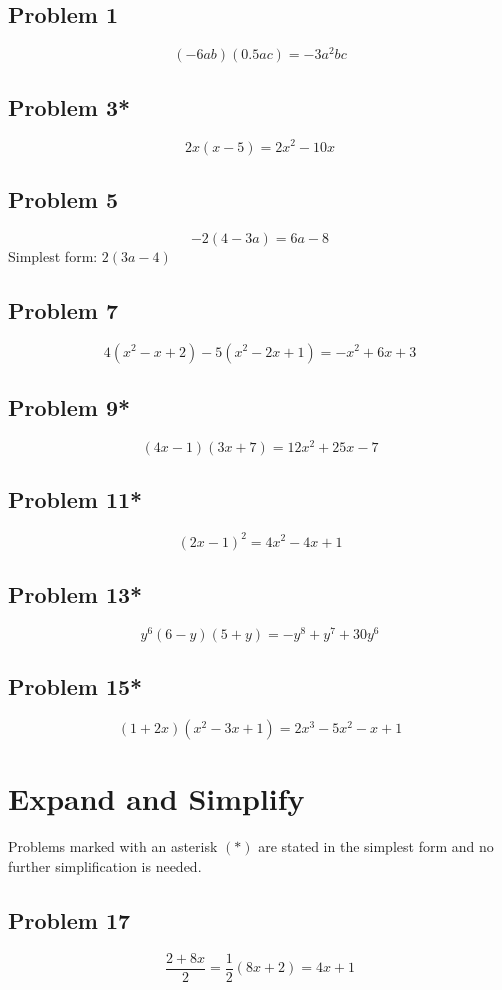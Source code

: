 \documentclass[11pt, oneside]{article}   	%
\begin{document}
\subsection{Problem 1}
$$(-6ab)(0.5ac)=-3a^{2}bc$$

\subsection{Problem 3*}
$$2 x (x - 5)=2 x^2-10 x$$

\subsection{Problem 5}
$$-2 (4 - 3 a) = 6 a -8 $$
Simplest form: $2 (3 a - 4)$

\subsection{Problem 7}
$$4 \left(x^2-x+2\right)-5 \left(x^2-2 x+1\right)=-x^2+6 x+3$$

\subsection{Problem 9*}
$$(4 x - 1) (3 x + 7) = 12 x^2+25 x-7$$

\subsection{Problem 11*}
$$(2 x - 1)^2=4 x^2-4 x+1$$

\subsection{Problem 13*}
$$y^6 (6 - y) (5 + y)=-y^8+y^7+30 y^6$$

\subsection{Problem 15*}
$$(1 + 2 x) (x^2 - 3 x + 1)=2 x^3-5 x^2-x+1$$


\section{Expand and Simplify}
Problems marked with an asterisk $(*)$ are stated in the simplest form and no further simplification is needed.

\subsection{Problem 17}
$$\frac{2+8x}{2} = \frac{1}{2} (8 x+2)= 4 x + 1$$
\end{document}
